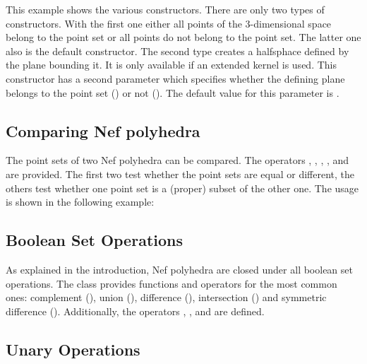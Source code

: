 This example shows the various constructors. There are only two
types of constructors. With the first one either all points of the 3-dimensional
space belong to the point set or all points do not belong to the point set. The
latter one also is the default constructor. The second type creates a halfsphace
defined by the plane bounding it. It is only available if an extended kernel is
used. This constructor has a second parameter which
specifies whether the defining plane belongs to the point set 
() or not (). The 
default value for this parameter is .


\subsection{Comparing Nef polyhedra}

The point sets of two Nef polyhedra can be compared. The operators \ccc{==}, 
\ccc{!=},
\ccc{<=}, \ccc{>=}, \ccc{<} and \ccc{>} 
are provided. The first two test whether the point sets 
are equal or different, the others test whether one point set is a (proper) 
subset of the other one. The usage is shown in the following example:


\subsection{Boolean Set Operations}

As explained in the introduction, Nef polyhedra are closed under all boolean 
set operations. The class  provides functions and
operators for the most common ones: complement (), union (), 
difference (), intersection () and 
symmetric difference (). Additionally, the operators 
\ccc{*=}, \ccc{-=}, \ccc{*=} and \ccc{^=} are defined.


\subsection{Unary Operations}

